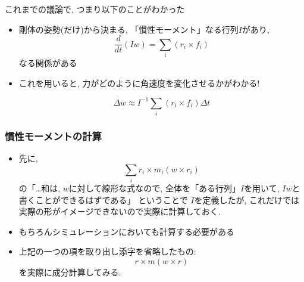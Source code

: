 \documentclass[10pt,dvipdfmx]{beamer}
\newcommand{\aka}[1]{{\color{red}#1}}
\begin{document}
\begin{frame}
\frametitle{}
これまでの議論で, つまり以下のことがわかった

\begin{itemize}
\item 剛体の姿勢(だけ)から決まる, 「慣性モーメント」なる行列$I$があり,
\[ \frac{d}{dt}(Iw) = \sum_i (r_i \times f_i) \]
なる関係がある

\item これを用いると, 力がどのように角速度を変化させるかがわかる!

\[ \Delta w \approx I^{-1} \sum_i (r_i \times f_i) \Delta t\]
\end{itemize}
\end{frame}


\begin{frame}
\frametitle{慣性モーメントの計算}
\begin{itemize}
\item 先に, 
\[ \sum_i r_i \times m_i (w \times r_i) \]
の\aka{「\ldots 和は, $w$に対して線形な式なので, 
全体を「ある行列」$I$を用いて, $Iw$と書くことができるはずである」}
ということで $I$を定義したが,
これだけでは実際の形がイメージできないので実際に計算しておく.
\item もちろんシミュレーションにおいても計算する必要がある
\item 上記の一つの項を取り出し添字を省略したもの:
\[ r \times m (w \times r) \]
を実際に成分計算してみる. 
\end{itemize}
\end{frame}
\end{document}

